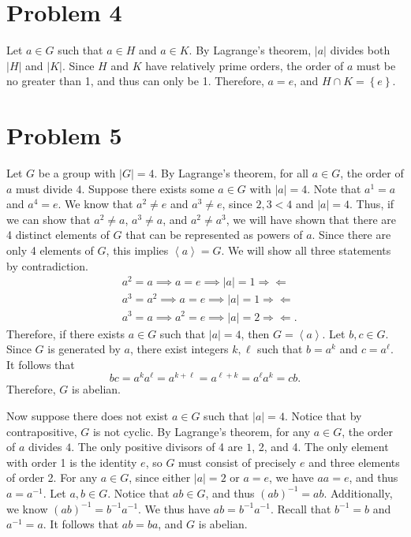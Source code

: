 \documentclass[11pt, letterpaper]{article}
\begin{document}
\section*{Problem 4}
\begin{solution}
Let $a\in G$ such that $a\in H$ and $a\in K$. By Lagrange's theorem, $\left| a \right| $ divides both $\left| H \right| $ and $\left| K \right| $. Since $H$ and $K$ have relatively prime orders, the order of $a$ must be no greater than 1, and thus can only be 1. Therefore, $a=e$, and $H\cap K=\left\{ e \right\} $.
\end{solution}
\section*{Problem 5}
\begin{solution}
Let $G$ be a group with $\left| G \right| =4$. By Lagrange's theorem, for all $a\in G$, the order of $a$ must divide $4$. Suppose there exists some $a\in G$ with $\left| a \right| =4$. Note that $a^1=a$ and $a^4=e$. We know that $a^2\neq e$ and $a^3\neq e$, since $2,3<4$ and $\left| a \right| =4$. Thus, if we can show  that $a^2\neq a$, $a^3\neq a$, and $a^2\neq a^3$, we will have shown that there are 4 distinct elements of $G$ that can be represented as powers of $a$. Since there are only 4 elements of $G$, this implies $\left<a \right> =G$. We will show all three statements by contradiction.
\begin{align*}
	&a^2=a \implies a=e \implies \left| a \right| =1 \Longrightarrow\Longleftarrow\\
	&a^3 = a^2 \implies a=e \implies \left| a \right| =1 \Longrightarrow\Longleftarrow\\
	&a^3 = a \implies a^2 = e \implies \left| a \right| =2 \Longrightarrow\Longleftarrow
.\end{align*}
Therefore, if there exists $a\in G$ such that $\left| a \right| =4$, then $G= \left<a \right>$. Let $b,c\in G$. Since $ G$ is generated by $a$, there exist integers $k,\ell $ such that $b=a^k$ and $c=a^\ell $. It follows that
\[
	bc=a^ka^\ell =a^{k+\ell }=a^{\ell +k}=a^\ell a^k=cb
.\]
Therefore, $G$ is abelian.

Now suppose there does not exist $a\in G$ such that $\left| a \right| =4$. Notice that by contrapositive, $G$ is not cyclic. By Lagrange's theorem, for any $a\in G$, the order of $a$ divides $4$. The only positive divisors of 4 are $1$, 2, and 4. The only element with order 1 is the identity $e$, so $G$ must consist of precisely $e$ and three elements of order 2. For any $a\in G $, since either $\left| a \right| =2$ or $a=e$, we have $aa=e$, and thus $a=a^{-1}$. Let $a,b\in G$. Notice that $ab\in G$, and thus $\left( ab \right) ^{-1}=ab$. Additionally, we know $\left( ab \right) ^{-1}=b^{-1}a^{-1}$. We thus have $ab=b^{-1}a^{-1}$. Recall that $b^{-1}=b$ and $a^{-1}=a$. It follows that $ab=ba$, and $G$ is abelian.
\end{solution}
\end{document}

